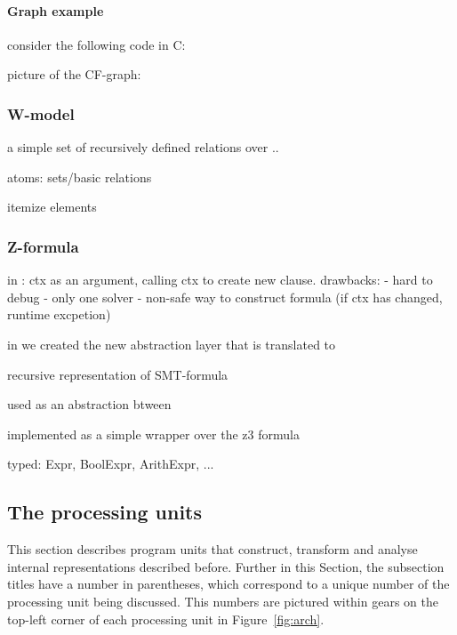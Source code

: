 \paragraph{Graph example}
\label{ch:impl:model:xgraph:example}

consider the following code in C:

picture of the CF-graph:


%

\subsubsection{W-model}
\label{ch:impl:model:wmodel}

a simple set of recursively defined relations over ..

atoms: sets/basic relations

itemize elements


\subsubsection{Z-formula}
\label{ch:impl:model:zformula}


in \porthos[1] : ctx as an argument, calling ctx to create new clause. 
drawbacks:
- hard to debug
- only one solver
- non-safe way to construct formula (if ctx has changed, runtime excpetion)

in \porthos[2] we created the new abstraction layer \zformula[] that is translated to 

recursive representation of SMT-formula

used as an abstraction btween

implemented as a simple wrapper over the z3 formula

typed: Expr, BoolExpr, ArithExpr, ...


\subsection{The processing units} %
\label{ch:impl:proc}


This section describes program units that construct, transform and analyse internal representations described before. %
Further in this Section, the subsection titles have a number in parentheses, which correspond to a unique number of the  processing unit being discussed.
This numbers are pictured within gears on the top-left corner of each processing unit in Figure~\ref{fig:arch}.

